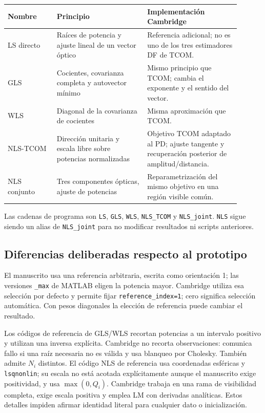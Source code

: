 \documentclass[11pt,a4paper]{article}
\begin{document}
\begin{center}\small
\begin{tabular}{>{\raggedright\arraybackslash}p{0.19\linewidth}>{\raggedright\arraybackslash}p{0.35\linewidth}>{\raggedright\arraybackslash}p{0.36\linewidth}}
\toprule Nombre & Principio & Implementación Cambridge \\
\midrule
LS directo & Raíces de potencia y ajuste lineal de un vector óptico & Referencia adicional; no es uno de los tres estimadores DF de TCOM. \\
GLS & Cocientes, covarianza completa y autovector mínimo & Mismo principio que TCOM; cambia el exponente y el sentido del vector. \\
WLS & Diagonal de la covarianza de cocientes & Misma aproximación que TCOM. \\
NLS-TCOM & Dirección unitaria y escala libre sobre potencias normalizadas & Objetivo TCOM adaptado al PD; ajuste tangente y recuperación posterior de amplitud/distancia. \\
NLS conjunto & Tres componentes ópticas, ajuste de potencias & Reparametrización del mismo objetivo en una región visible común. \\
\bottomrule
\end{tabular}\end{center}

Las cadenas de programa son \texttt{LS}, \texttt{GLS}, \texttt{WLS}, \texttt{NLS\_TCOM} y \texttt{NLS\_joint}. \texttt{NLS} sigue siendo un alias de \texttt{NLS\_joint} para no modificar resultados ni scripts anteriores.

\subsection{Diferencias deliberadas respecto al prototipo}
El manuscrito usa una referencia arbitraria, escrita como orientación 1; las versiones \texttt{\_max} de MATLAB eligen la potencia mayor. Cambridge utiliza esa selección por defecto y permite fijar \texttt{reference\_index=1}; cero significa selección automática. Con pesos diagonales la elección de referencia puede cambiar el resultado.

Los códigos de referencia de GLS/WLS recortan potencias a un intervalo positivo y utilizan una inversa explícita. Cambridge no recorta observaciones: comunica fallo si una raíz necesaria no es válida y usa blanqueo por Cholesky. También admite $N_i$ distintos. El código NLS de referencia usa coordenadas esféricas y \texttt{lsqnonlin}; su escala no está acotada explícitamente aunque el manuscrito exige positividad, y usa $\max(0,Q_i)$. Cambridge trabaja en una rama de visibilidad completa, exige escala positiva y emplea LM con derivadas analíticas. Estos detalles impiden afirmar identidad literal para cualquier dato o inicialización.
\end{document}
